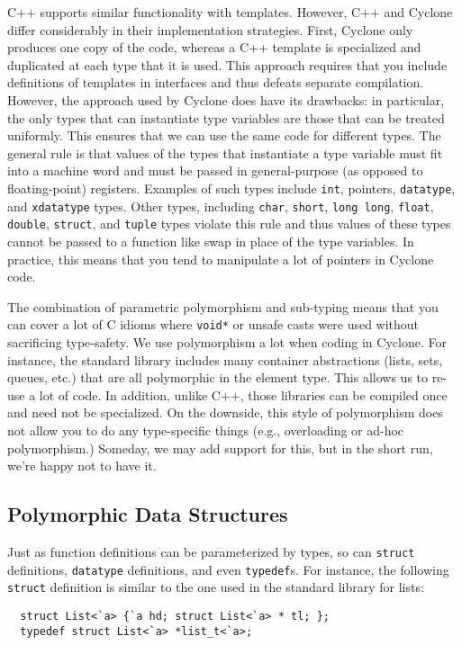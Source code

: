 C++ supports similar functionality with templates.  However, C++ and
Cyclone differ considerably in their implementation strategies.
First, Cyclone only produces one copy of the code, whereas a C++
template is specialized and duplicated at each type that it is used.
This approach requires that you include definitions of templates in
interfaces and thus defeats separate compilation.  However, the
approach used by Cyclone does have its drawbacks: in particular, the
only types that can instantiate type variables are those that can be
treated uniformly.  This ensures that we can use the same code for
different types.  The general rule is that values of the types that
instantiate a type variable must fit into a machine word and must be
passed in general-purpose (as opposed to floating-point) registers.
Examples of such types include \texttt{int}, pointers, \texttt{datatype},
and \texttt{xdatatype} types.  Other types, including \texttt{char},
\texttt{short}, \texttt{long long}, \texttt{float}, \texttt{double},
\texttt{struct}, and \texttt{tuple} types violate this rule and thus
values of these types cannot be passed to a function like swap in
place of the type variables. In practice, this means that you tend to
manipulate a lot of pointers in Cyclone code.

The combination of parametric polymorphism and sub-typing means that
you can cover a lot of C idioms where \texttt{void*} or unsafe casts
were used without sacrificing type-safety.  We use polymorphism a lot
when coding in Cyclone.  For instance, the standard library includes
many container abstractions (lists, sets, queues, etc.) that are all
polymorphic in the element type.  This allows us to re-use a lot of
code.  In addition, unlike C++, those libraries can be compiled once
and need not be specialized.  On the downside, this style of
polymorphism does not allow you to do any type-specific things (e.g.,
overloading or ad-hoc polymorphism.)  Someday, we may add support for
this, but in the short run, we're happy not to have it.


\subsection{Polymorphic Data Structures}
Just as function definitions can be parameterized by types, so can
\texttt{struct} definitions, \texttt{datatype} definitions, and even
\texttt{typedef}s.  For instance, the following \texttt{struct} definition
is similar to the one used in the standard library for lists:
\begin{verbatim}
  struct List<`a> {`a hd; struct List<`a> * tl; };
  typedef struct List<`a> *list_t<`a>;
\end{verbatim}

